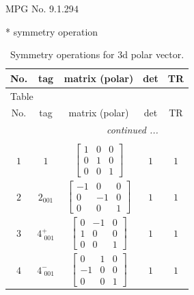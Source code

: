 \documentclass[fleqn,8pt]{jsarticle}
\begin{document}
\setcounter{MaxMatrixCols}{32}

\renewcommand{\tablename}{Table~}
\renewcommand{\figurename}{Figure~}
\begin{center}
\LARGE
MPG No. 9.1.29\quad$4$
\end{center}
* symmetry operation
\renewcommand{\arraystretch}{1.3}
\begin{longtable}{ccccc}
\caption{Symmetry operations for 3d polar vector.}
 \\
 \hline \hline
No. & tag & matrix (polar) & det & TR \\ \hline \endfirsthead

\multicolumn{4}{l}{\tablename\ \thetable{}} \\
 \hline \hline
No. & tag & matrix (polar) & det & TR \\ \hline \endhead

 \hline \hline
\multicolumn{4}{r}{\footnotesize\it continued ...} \\ \endfoot

 \hline \hline
\multicolumn{4}{r}{} \\ \endlastfoot

$ 1 $ & $ 1 $ & $ \begin{bmatrix} 1 & 0 & 0 \\ 0 & 1 & 0 \\ 0 & 0 & 1 \end{bmatrix} $ & $ 1 $ & $ 1 $ \\ \hline
$ 2 $ & $ 2{}_{001} $ & $ \begin{bmatrix} -1 & 0 & 0 \\ 0 & -1 & 0 \\ 0 & 0 & 1 \end{bmatrix} $ & $ 1 $ & $ 1 $ \\ \hline
$ 3 $ & $ 4^{+}_{\,\,001} $ & $ \begin{bmatrix} 0 & -1 & 0 \\ 1 & 0 & 0 \\ 0 & 0 & 1 \end{bmatrix} $ & $ 1 $ & $ 1 $ \\ \hline
$ 4 $ & $ 4^{-}_{\,\,001} $ & $ \begin{bmatrix} 0 & 1 & 0 \\ -1 & 0 & 0 \\ 0 & 0 & 1 \end{bmatrix} $ & $ 1 $ & $ 1 $ \\
\end{longtable}
\end{document}
